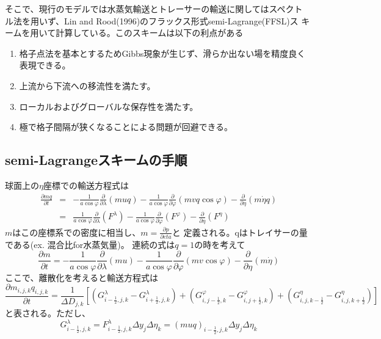 \documentclass{jsbook}
\begin{document}
そこで、現行のモデルでは水蒸気輸送とトレーサーの輸送に関してはスペクト
ル法を用いず、Lin and Rood(1996)のフラックス形式semi-Lagrange(FFSL)ス
キームを用いて計算している。このスキームは以下の利点がある
\begin{enumerate}
\item 格子点法を基本とするためGibbs現象が生じず、滑らか出ない場を精度良く表現できる。
\item 上流から下流への移流性を満たす。
\item ローカルおよびグローバルな保存性を満たす。
\item 極で格子間隔が狭くなることによる問題が回避できる。
\end{enumerate}

\subsection{semi-Lagrangeスキームの手順}
球面上の$\eta$座標での輸送方程式は
\begin{eqnarray*}
  \frac{\partial mq}{\partial t} &=& - \frac{1}{a \cos \varphi} \frac{\partial}{\partial \lambda}(muq)- \frac{1}{a \cos \varphi} \frac{\partial}{\partial \varphi}(mvq \cos \varphi)- \frac{\partial}{\partial \eta} (m \dot{\eta} q)\\
  &=& \frac{1}{a \cos \varphi} \frac{\partial}{\partial \lambda}(F^{\lambda})- \frac{1}{a \cos \varphi} \frac{\partial}{\partial \varphi}(F^{\varphi})- \frac{\partial}{\partial \eta} (F^{\eta})
\end{eqnarray*}
$m$はこの座標系での密度に相当し、$m=\frac{\partial p}{\partial eta}$と
定義される。qはトレイサーの量である(ex. 混合比for水蒸気量)。
連続の式は$q=1$の時を考えて
\begin{equation}
  \frac{\partial m}{\partial t} = - \frac{1}{a \cos \varphi} \frac{\partial}{\partial \lambda}(mu)- \frac{1}{a \cos \varphi} \frac{\partial}{\partial \varphi}(mv \cos \varphi)- \frac{\partial}{\partial \eta} (m \dot{\eta})
\end{equation}
ここで、離散化を考えると輸送方程式は
\begin{equation}
  \frac{\partial m_{i,j,k} q_{i,j,k}}{\partial t}=\frac{1}{\Delta D_{j,k}}\left[\left(G^{\lambda}_{i-\frac{1}{2},j,k}-G^{\lambda}_{i+\frac{1}{2},j,k}\right)+\left(G^{\varphi}_{i,j-\frac{1}{2},k}-G^{\varphi}_{i,j+\frac{1}{2},k}\right)+\left(G^{\eta}_{i,j,k-\frac{1}{2}}-G^{\eta}_{i,j,k+\frac{1}{2}}\right)\right]
\end{equation}
と表される。ただし、
\begin{equation}
  G^{\lambda}_{i-\frac{1}{2},j,k}=F^{\lambda}_{i-\frac{1}{2},j,k} \Delta y_{j} \Delta \eta_{k}=(muq)_{i-\frac{1}{2},j,k} \Delta y_{j} \Delta \eta_{k}
\end{equation}
\end{document}
